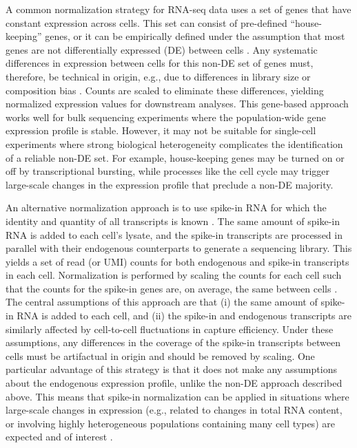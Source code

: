 \documentclass{article}
\begin{document}
A common normalization strategy for RNA-seq data uses a set of genes that have constant expression across cells.
This set can consist of pre-defined ``house-keeping'' genes, or it can be empirically defined under the assumption that most genes are not differentially expressed (DE) between cells \autocite{lun2016pooling,anders2010differential,robinson2010tmm}.
Any systematic differences in expression between cells for this non-DE set of genes must, therefore, be technical in origin, e.g., due to differences in library size or composition bias \autocite{robinson2010tmm}.
Counts are scaled to eliminate these differences, yielding normalized expression values for downstream analyses.
This gene-based approach works well for bulk sequencing experiments where the population-wide gene expression profile is stable.
However, it may not be suitable for single-cell experiments where strong biological heterogeneity complicates the identification of a reliable non-DE set. 
For example, house-keeping genes may be turned on or off by transcriptional bursting, while processes like the cell cycle may trigger large-scale changes in the expression profile that preclude a non-DE majority.

An alternative normalization approach is to use spike-in RNA for which the identity and quantity of all transcripts is known \autocite{stegle2015computational,bacher2016design}.
The same amount of spike-in RNA is added to each cell's lysate, and the spike-in transcripts are processed in parallel with their endogenous counterparts to generate a sequencing library.
This yields a set of read (or UMI) counts for both endogenous and spike-in transcripts in each cell.
Normalization is performed by scaling the counts for each cell such that the counts for the spike-in genes are, on average, the same between cells \autocite{katayama2013samstrt}.
The central assumptions of this approach are that (i) the same amount of spike-in RNA is added to each cell, and (ii) the spike-in and endogenous transcripts are similarly affected by cell-to-cell fluctuations in capture efficiency.
Under these assumptions, any differences in the coverage of the spike-in transcripts between cells must be artifactual in origin and should be removed by scaling.
One particular advantage of this strategy is that it does not make any assumptions about the endogenous expression profile, unlike the non-DE approach described above.
This means that spike-in normalization can be applied in situations where large-scale changes in expression (e.g., related to changes in total RNA content, or involving highly heterogeneous populations containing many cell types) are expected and of interest \autocite{lun2016stepbystep,nestorowa2016single}.
\end{document}
